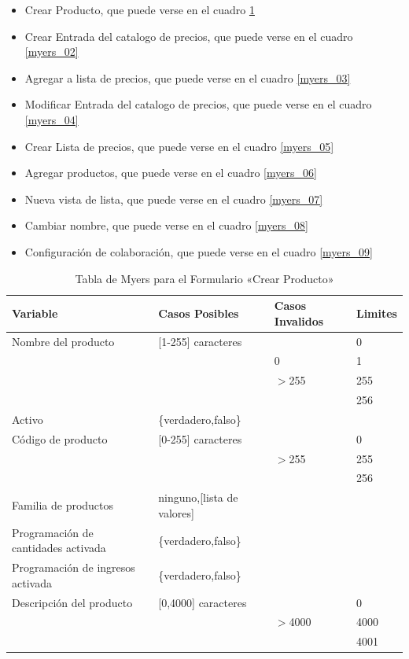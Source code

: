 \begin{itemize}
\item Crear Producto, que puede verse en el cuadro \ref{myers_01}
\item Crear Entrada del catalogo de precios, que puede verse en el cuadro \ref{myers_02}
\item Agregar a lista de precios, que puede verse en el cuadro \ref{myers_03}
\item Modificar Entrada del catalogo de precios, que puede verse en el cuadro \ref{myers_04}
\item Crear Lista de precios, que puede verse en el cuadro \ref{myers_05}
\item Agregar productos, que puede verse en el cuadro \ref{myers_06}
\item Nueva vista de lista, que puede verse en el cuadro \ref{myers_07}
\item Cambiar nombre, que puede verse en el cuadro \ref{myers_08}
\item Configuración de colaboración, que puede verse en el cuadro \ref{myers_09}
\end{itemize}

\begin{table}
\centering
\begin{tabular}{|p{6.0cm}|l|l|l|}
\hline
\footnotesize{\textbf{Variable}} & \footnotesize{\textbf{Casos Posibles}} & \footnotesize{\textbf{Casos Invalidos}} & \footnotesize{\textbf{Limites}} \\
\hline
\footnotesize{Nombre del producto} & \footnotesize{[1-255] caracteres} & & \footnotesize{0} \\
& & \footnotesize{0} & \footnotesize{1} \\
& & \footnotesize{$>$255} & \footnotesize{255} \\
& & & \footnotesize{256} \\
\hline
\footnotesize{Activo} & \footnotesize{\{verdadero,falso\}} & & \\
\hline
\footnotesize{Código de producto} & \footnotesize{[0-255] caracteres} & & \footnotesize{0} \\
& & \footnotesize{$>$255} & \footnotesize{255} \\
& & & \footnotesize{256} \\
\hline
\footnotesize{Familia de productos} & \footnotesize{ninguno,[lista de valores]} & & \\
\hline
\footnotesize{Programación de cantidades activada} & \footnotesize{\{verdadero,falso\}} & & \\
\hline
\footnotesize{Programación de ingresos activada} & \footnotesize{\{verdadero,falso\}} & & \\
\hline
\footnotesize{Descripción del producto} & \footnotesize{[0,4000] caracteres} & & \footnotesize{0} \\
& & \footnotesize{$>$4000} & \footnotesize{4000} \\
& & & \footnotesize{4001} \\
\hline
\end{tabular}
\caption{Tabla de Myers para el Formulario «Crear Producto»}
\label{myers_01}
\end{table}

